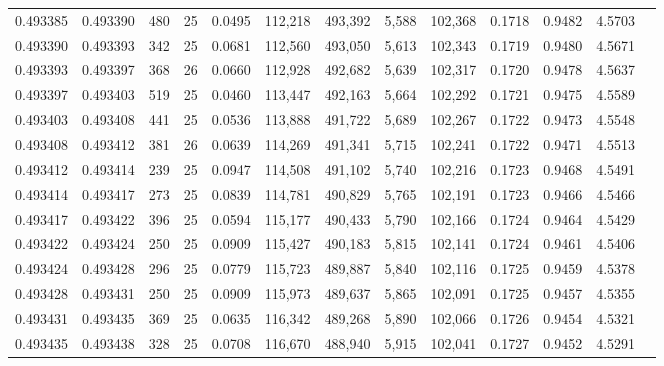 \begin{tabular}{rrrrrrrrrrrrr}
0.493385 & 0.493390 &   480 &  25 &                                     0.0495 & 112,218 & 493,392 &   5,588 & 102,368 & 0.1718 & 0.9482 & 4.5703 \\
0.493390 & 0.493393 &   342 &  25 &                                     0.0681 & 112,560 & 493,050 &   5,613 & 102,343 & 0.1719 & 0.9480 & 4.5671 \\
0.493393 & 0.493397 &   368 &  26 &                                     0.0660 & 112,928 & 492,682 &   5,639 & 102,317 & 0.1720 & 0.9478 & 4.5637 \\
0.493397 & 0.493403 &   519 &  25 &                                     0.0460 & 113,447 & 492,163 &   5,664 & 102,292 & 0.1721 & 0.9475 & 4.5589 \\
0.493403 & 0.493408 &   441 &  25 &                                     0.0536 & 113,888 & 491,722 &   5,689 & 102,267 & 0.1722 & 0.9473 & 4.5548 \\
0.493408 & 0.493412 &   381 &  26 &                                     0.0639 & 114,269 & 491,341 &   5,715 & 102,241 & 0.1722 & 0.9471 & 4.5513 \\
0.493412 & 0.493414 &   239 &  25 &                                     0.0947 & 114,508 & 491,102 &   5,740 & 102,216 & 0.1723 & 0.9468 & 4.5491 \\
0.493414 & 0.493417 &   273 &  25 &                                     0.0839 & 114,781 & 490,829 &   5,765 & 102,191 & 0.1723 & 0.9466 & 4.5466 \\
0.493417 & 0.493422 &   396 &  25 &                                     0.0594 & 115,177 & 490,433 &   5,790 & 102,166 & 0.1724 & 0.9464 & 4.5429 \\
0.493422 & 0.493424 &   250 &  25 &                                     0.0909 & 115,427 & 490,183 &   5,815 & 102,141 & 0.1724 & 0.9461 & 4.5406 \\
0.493424 & 0.493428 &   296 &  25 &                                     0.0779 & 115,723 & 489,887 &   5,840 & 102,116 & 0.1725 & 0.9459 & 4.5378 \\
0.493428 & 0.493431 &   250 &  25 &                                     0.0909 & 115,973 & 489,637 &   5,865 & 102,091 & 0.1725 & 0.9457 & 4.5355 \\
0.493431 & 0.493435 &   369 &  25 &                                     0.0635 & 116,342 & 489,268 &   5,890 & 102,066 & 0.1726 & 0.9454 & 4.5321 \\
0.493435 & 0.493438 &   328 &  25 &                                     0.0708 & 116,670 & 488,940 &   5,915 & 102,041 & 0.1727 & 0.9452 & 4.5291 \\

\end{tabular}
